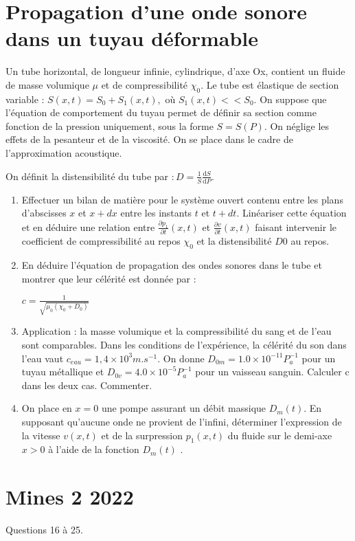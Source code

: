 \documentclass{article}
\begin{document}
\section{Propagation d'une onde sonore dans un tuyau déformable}




Un tube horizontal, de longueur infinie, cylindrique, d’axe Ox, contient un fluide de masse
volumique $\mu$ et de compressibilité $\chi_0$.
Le tube est élastique de section variable : $S(x,t)=S_{0}+S_{1}(x,t),$ où $ S_{1}(x,t) << S_{0}.$ On suppose
que l’équation de comportement du tuyau permet de définir sa section comme fonction de la
pression uniquement, sous la forme $S = S(P)$.
On néglige les effets de la pesanteur et de la viscosité. On se place dans le cadre de l’approximation acoustique.

On définit la distensibilité du tube par $:D={\frac{1}{S}}{\frac{\mathrm{d}S}{\mathrm{d}P}}.$

\begin{enumerate}
  \item Effectuer un bilan de matière pour le système ouvert contenu entre les plans d’abscisses
  $x$ et $x+ dx $ entre les instants $t$ et $t+dt$. Linéariser cette équation et en déduire une relation entre ${\frac{\partial p_{1}}{\partial t}}(x,t)$ et ${\frac{\partial v}{\partial t}}(x,t)$
  faisant intervenir le coefficient de compressibilité au repos $\chi_0$ et
 la distensibilité $D0$ au repos.
 \item En déduire l’équation de propagation des ondes sonores dans le tube et montrer que leur
 célérité est donnée par :

 $c={\frac{1}{\sqrt{\mu_{0}(\chi_{0}+D_{0})}}}$

  \item Application : la masse volumique et la compressibilité du sang et de l'eau sont comparables.
  Dans les conditions de l’expérience, la célérité du son dans l’eau vaut $c_{eau} = 1,4 \times 10^3 m.s^{-1}$. 
  On donne $D_{0m}=1.0\times10^{-11} P_a^{-1}$ pour un tuyau métallique et $D_{0v}=4.0\times10^{-5} P_a^{-1}$
  pour un vaisseau sanguin.
  Calculer c dans les deux cas. Commenter.

  \item On place en $x = 0$ une pompe assurant un débit massique $D_m(t)$. En supposant qu’aucune
  onde ne provient de l’infini, déterminer l’expression de la vitesse $v(x,t)$ et de la surpression
  $p_1(x,t)$ du fluide sur le demi-axe $x > 0$ à l’aide de la fonction $D_m (t)$ .

\end{enumerate}


\section{ Mines 2 2022} 

Questions 16 à 25. 
 
\end{document}
